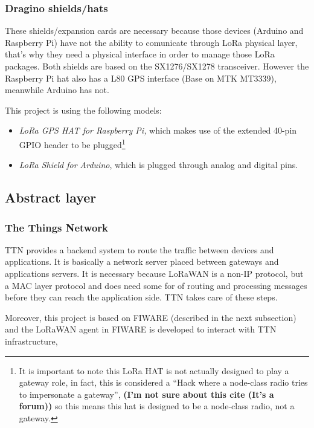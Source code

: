 \documentclass[11pt,a4paper,dvipsnames,twoside]{article}
\newcommand{\doubt}[1] {\textbf{\color{Red3}#1}}
\begin{document}
\subsubsection{Dragino shields/hats}\label{sssec:DraginoShields}
These shields/expansion cards are necessary because those devices (Arduino and Raspberry Pi) have not the ability to comunicate through LoRa physical layer, that's why they need a physical interface in order to manage those LoRa packages. Both shields are based on the SX1276/SX1278 transceiver. However the Raspberry Pi hat also has a L80 GPS interface (Base on MTK MT3339), meanwhile Arduino has not.

This project is using the following models: 

\begin{itemize}
  \item \textit{LoRa GPS HAT for Raspberry Pi,}\cite{DraginoRpiHat} which makes use of the extended 40-pin GPIO header to be plugged\footnote{It is important to note this LoRa HAT is not actually designed to play a gateway role, in fact, this is considered a \enquote{Hack where a node-class radio tries to impersonate a gateway}\cite{RpiHatHack}, \doubt{(I'm not sure about this cite (It's a forum))} so this means this hat is designed to be a node-class radio, not a gateway.}
  \item \textit{LoRa Shield for Arduino}\cite{DraginoArdShield}, which is plugged through analog and digital pins.
\end{itemize}

\subsection{Abstract layer}

\subsubsection{The Things Network}
TTN provides a backend system to route the traffic between devices and applications. It is basically a network server placed between gateways and applications servers. It is necessary because LoRaWAN is a non-IP protocol, but a MAC layer protocol and does need some for of routing and processing messages before they can reach the application side. TTN takes care of these steps.

Moreover, this project is based on FIWARE (described in the next subsection) and the LoRaWAN agent in FIWARE is developed to interact with TTN infrastructure, 
\end{document}
